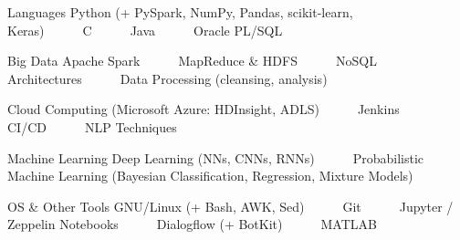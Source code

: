 

\begin{cvskills}

  \cvskill
    {Languages} %
    {Python (+ PySpark, NumPy, Pandas, scikit-learn, Keras)~~~\textbullet~~~C~~~\textbullet~~~Java~~~\textbullet~~~Oracle PL/SQL} %

  \cvskill
    {Big Data} %
    {Apache Spark~~~\textbullet~~~MapReduce \& HDFS~~~\textbullet~~~NoSQL Architectures~~~\textbullet~~~Data Processing (cleansing, analysis)~~~\textbullet~~~} %
    
\cvskill
    {} %
    {Cloud Computing (Microsoft Azure: HDInsight, ADLS)~~~\textbullet~~~Jenkins CI/CD~~~\textbullet~~~NLP Techniques} %

  \cvskill
    {Machine Learning} %
    {Deep Learning (NNs, CNNs, RNNs)~~~\textbullet~~~Probabilistic Machine Learning (Bayesian Classification, Regression, Mixture Models)} %

  \cvskill
    {OS \& Other Tools} %
    {GNU/Linux (+ Bash, AWK, Sed)~~~\textbullet~~~Git~~~\textbullet~~~Jupyter / Zeppelin Notebooks~~~\textbullet~~~Dialogflow (+ BotKit)~~~\textbullet~~~MATLAB} %

\end{cvskills}
